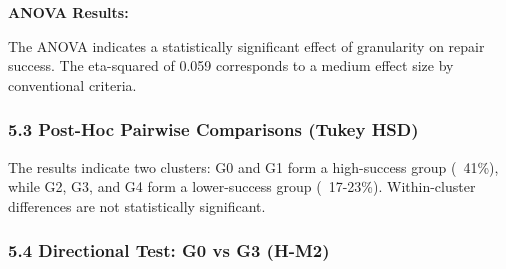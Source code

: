 \textbf{ANOVA Results:}

\begin{table}[htbp]
\centering
{}
\end{table}

The ANOVA indicates a statistically significant effect of granularity on repair success. The eta-squared of 0.059 corresponds to a medium effect size by conventional criteria.

\subsubsection{5.3 Post-Hoc Pairwise Comparisons (Tukey HSD)}

\begin{table}[htbp]
\centering
{}
\end{table}

The results indicate two clusters: G0 and G1 form a high-success group (~41\%), while G2, G3, and G4 form a lower-success group (~17-23\%). Within-cluster differences are not statistically significant.

\subsubsection{5.4 Directional Test: G0 vs G3 (H-M2)}

